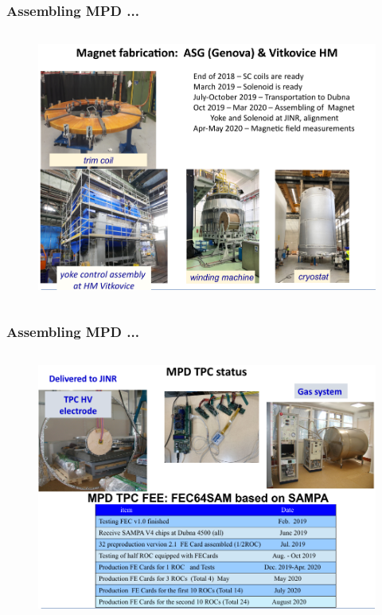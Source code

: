 \documentclass[dvipsnames] {beamer}
\begin{document}
\begin{frame}
  \frametitle {\bf \centering Assembling MPD ...}
  \vskip -0.5cm
  \begin{columns}[t]
   \begin{block}{}
       \begin{figure}[H]
         \includegraphics[width=1.\textwidth]{MPD_magnetFabrication.png}
       \end{figure}
   \end{block}
  \end{columns}
\end{frame}

\begin{frame}
  \frametitle {\bf \centering Assembling MPD ...}
   \vskip -0.5cm
  \begin{columns}[t]
   \begin{block}{}
       \begin{figure}[H]
         \includegraphics[width=1.\textwidth]{MPD_tpcFabrication.png}
       \end{figure}
   \end{block}
  \end{columns}
\end{frame}
\end{document}
